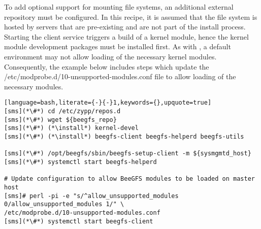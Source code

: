 To add optional support for mounting \beegfs{} file systems, an 
additional external \pkgmgr{} repository must be configured. In this recipe, it is
assumed that the \beegfs{} file system is hosted by servers that are pre-existing
and are not part of the install process. Starting the client service triggers
a build of a kernel module, hence the kernel module development packages must be
installed first. As with \lustre{}, a default \baseOS{} environment may not allow 
loading of the necessary \beegfs{} kernel modules. Consequently, the example below 
includes steps which update the /etc/modprobe.d/10-unsupported-modules.conf file 
to allow loading of the necessary modules.

\begin{lstlisting}[language=bash,literate={-}{-}1,keywords={},upquote=true]
[sms](*\#*) cd /etc/zypp/repos.d
[sms](*\#*) wget ${beegfs_repo}
[sms](*\#*) (*\install*) kernel-devel
[sms](*\#*) (*\install*) beegfs-client beegfs-helperd beegfs-utils

[sms](*\#*) /opt/beegfs/sbin/beegfs-setup-client -m ${sysmgmtd_host}
[sms](*\#*) systemctl start beegfs-helperd

# Update configuration to allow BeeGFS modules to be loaded on master host
[sms]# perl -pi -e "s/^allow_unsupported_modules 0/allow_unsupported_modules 1/" \
/etc/modprobe.d/10-unsupported-modules.conf
[sms](*\#*) systemctl start beegfs-client
\end{lstlisting}
